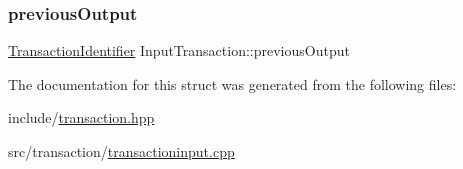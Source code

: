 \subsubsection{\texorpdfstring{previous\+Output}{previousOutput}}
{\footnotesize\ttfamily \mbox{\hyperlink{structTransactionIdentifier}{Transaction\+Identifier}} Input\+Transaction\+::previous\+Output}



The documentation for this struct was generated from the following files\+:\begin{DoxyCompactItemize}
\item 
include/\mbox{\hyperlink{transaction_8hpp}{transaction.\+hpp}}\item 
src/transaction/\mbox{\hyperlink{transactioninput_8cpp}{transactioninput.\+cpp}}\end{DoxyCompactItemize}
